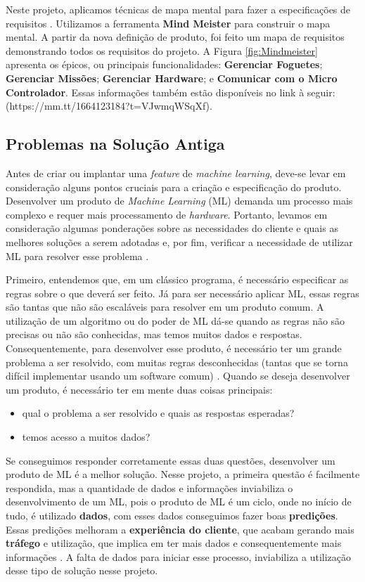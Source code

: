 Neste projeto, aplicamos técnicas de mapa mental para fazer a especificações de requisitos \cite{mapamental}. Utilizamos a ferramenta \textbf{Mind Meister} para construir o mapa mental.
A partir da nova definição de produto, foi feito um mapa de requisitos demonstrando todos os requisitos do projeto. A Figura \ref{fig:Mindmeister} apresenta os épicos, ou principais funcionalidades: \textbf{Gerenciar Foguetes}; \textbf{Gerenciar Missões}; \textbf{Gerenciar Hardware}; e \textbf{Comunicar com o Micro Controlador}. Essas informações também estão disponíveis no link à seguir:  (https://mm.tt/1664123184?t=VJwmqWSqXf).



\subsection{Problemas na Solução Antiga}
\label{problema_solucao_antiga}
Antes de criar ou implantar uma \textit{feature} de \textit{machine learning}, deve-se levar em consideração alguns pontos cruciais para a criação e especificação do produto. Desenvolver um produto de \textit{Machine Learning} (ML) demanda um processo mais complexo e requer mais processamento de \textit{hardware}. Portanto, levamos em consideração algumas ponderações sobre as necessidades do cliente e quais as melhores soluções a serem adotadas e, por fim, verificar a necessidade de utilizar ML para resolver esse problema \cite{shams2018developing}.

Primeiro, entendemos que, em um clássico programa, é necessário especificar as regras sobre o que deverá ser feito. Já para ser necessário aplicar ML, essas regras são tantas que não são escaláveis para resolver em um produto comum. A utilização de um algoritmo ou do poder de ML dá-se quando as regras não são precisas ou não são conhecidas, mas temos muitos dados e respostas. Consequentemente, para desenvolver esse produto, é necessário ter um grande problema a ser resolvido, com muitas regras desconhecidas (tantas que se torna difícil implementar usando um software comum) \cite{amershi2019software}. Quando se deseja desenvolver um produto, é necessário ter em mente duas coisas principais:
\begin{itemize}
    \item qual o problema a ser resolvido e quais as respostas esperadas?
    \item temos acesso a muitos dados?
\end{itemize}

Se conseguimos responder corretamente essas duas questões, desenvolver um produto de ML é a melhor solução. Nesse projeto, a primeira questão é facilmente respondida, mas a quantidade de dados e informações inviabiliza o desenvolvimento de um ML, pois o produto de ML é um ciclo, onde no início de tudo, é utilizado \textbf{dados}, com esses dados conseguimos fazer boas \textbf{predições}. Essas predições melhoram a \textbf{experiência do cliente}, que acabam gerando mais \textbf{tráfego} e utilização, que implica em ter mais dados e consequentemente mais informações \cite{yandong2005development}. A falta de dados para iniciar esse processo, inviabiliza a utilização desse tipo de solução nesse projeto.

